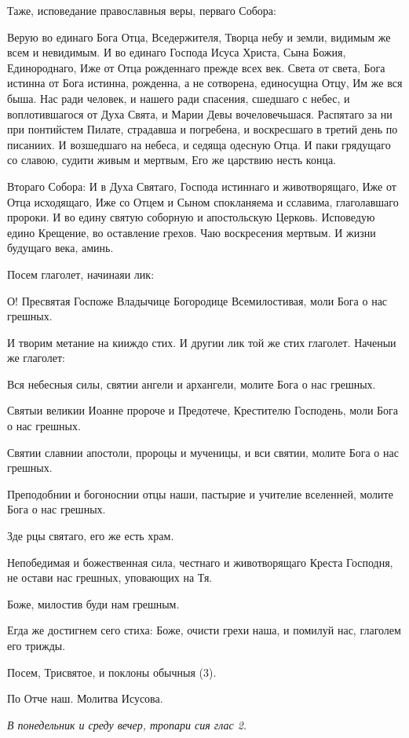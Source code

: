 Таже, исповедание православныя веры, перваго Собора:

Верую во единаго Бога Отца, Вседержителя, Творца небу и земли, видимым же всем и невидимым. И во единаго Господа Исуса Христа, Сына Божия, Единороднаго, Иже от Отца рожденнаго прежде всех век. Света от света, Бога истинна от Бога истинна, рожденна, а не сотворена, единосущна Отцу, Им же вся быша. Нас ради человек, и нашего ради спасения, сшедшаго с небес, и воплотившагося от Духа Свята, и Марии Девы вочеловечьшася. Распятаго за ни при понтийстем Пилате, страдавша и погребена, и воскресшаго в третий день по писаниих. И возшедшаго на небеса, и седяща одесную Отца. И паки грядущаго со славою, судити живым и мертвым, Его же царствию несть конца.

Втораго Собора: И в Духа Святаго, Господа истиннаго и животворящаго, Иже от Отца исходящаго, Иже со Отцем и Сыном спокланяема и сславима, глаголавшаго пророки. И во едину святую соборную и апостольскую Церковь. Исповедую едино Крещение, во оставление грехов. Чаю воскресения мертвым. И жизни будущаго века, аминь.

Посем глаголет, начинаяи лик:

О! Пресвятая Госпоже Владычице Богородице Всемилостивая, моли Бога о нас грешных. 

И творим метание на кииждо стих. И другии лик той же стих глаголет. Наченыи же глаголет: 

Вся небесныя силы, святии ангели и архангели, молите Бога о нас грешных.

Святыи великии Иоанне пророче и Предотече, Крестителю Господень, моли Бога о нас грешных.

Святии славнии апостоли, пророцы и мученицы, и вси святии, молите Бога о нас грешных.

Преподобнии и богоноснии отцы наши, пастырие и учителие вселенней, молите Бога о нас грешных.

Зде рцы святаго, его же есть храм.

Непобедимая и божественная сила, честнаго и животворящаго Креста Господня, не остави нас грешных, уповающих на Тя. 

Боже, милостив буди нам грешным. 

Егда же достигнем сего стиха: Боже, очисти грехи наша, и помилуй нас, глаголем его трижды.

Посем, Трисвятое, и поклоны обычныя (3). 

По Отче наш. Молитва Исусова.


\itshape В понедельник и среду вечер, тропари сия глас 2.\normalfont{}

